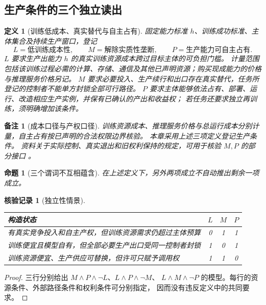 \documentclass[12pt,a4paper,openany]{report}
\newtheorem{definition}{定义}[chapter]
\newtheorem{proposition}{命题}[chapter]
\newtheorem{remark}{备注}[chapter]
\newtheorem{Certificate}{核验记录}[chapter]
\numberwithin{equation}{chapter}
\begin{document}
\begin{CJK*}{UTF8}{gkai}
\section{生产条件的三个独立读出}

\begin{definition}[训练低成本、真实替代与自主占有]
固定能力标准 $h$、训练成功标准、主体集合及持续生产窗口，登记
\[
 L=\text{低训练成本性},\qquad
 M=\text{解除实质性垄断},\qquad
 P=\text{生产能力可自主占有}.
\]
$L$ 要求生产出能力 $h$ 的真实训练资源成本跨过目标主体的可负担门槛。
计量范围包括该训练过程必需的计算、存储、通信及其他已声明资源；购买现成能力的价格与推理服务价格另记。
$M$ 要求必要投入、生产续行和出口存在真实替代，任务所登记的控制者不能单方封锁全部可行路径。
$P$ 要求主体能够依法占有、部署、运行、改造相应生产实例，并保有已确认的产出和收益权；
若任务还要求独立再训练，须明确增加该条件。
\end{definition}

\begin{remark}[成本口径与产权口径]
训练资源成本、推理服务价格与总运行成本分别计量，自主占有按已声明的合法权限边界核验。
本章采用上述三项定义登记生产条件。
资料关于实际控制、真实退出和旧权利保持的规定，可用于核验 $M,P$ 的部分接口
\cite[《偏好多样性、权利边界与可兑现分配》，“独立最小救济与真实退出”及
“有界权限与不依赖单方批准的履约”两章]{SourcePreference}。
\end{remark}

\begin{proposition}[三个谓词不互相蕴含]
在上述定义下，另外两项成立不自动推出剩余一项成立。
\end{proposition}
\begin{Certificate}[独立性情景]
\begin{center}
\begin{tabular}{P{0.64\textwidth}ccc}
\toprule
构造状态 & $L$ & $M$ & $P$\\
\midrule
有真实竞争投入和自主产权，但训练资源需求仍超过主体预算 & 0&1&1\\
训练便宜且模型自有，但全部必要生产出口受同一控制者封锁 & 1&0&1\\
训练资源便宜、生产供应可替换，但许可只赋予调用权 & 1&1&0\\
\bottomrule
\end{tabular}
\end{center}
\end{Certificate}
\begin{proof}
三行分别给出 $M\land P\land\neg L$、$L\land P\land\neg M$、
$L\land M\land\neg P$ 的模型。每行的资源条件、外部路径条件和权利条件可分别指定，
因而没有违反定义中的共同要求。
\end{proof}


\end{CJK*}
\end{document}
